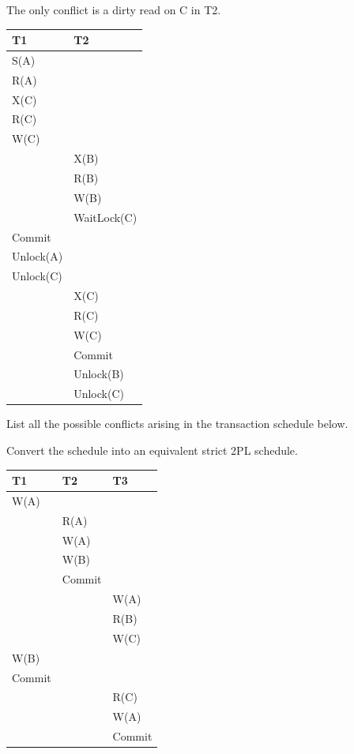 \documentclass{beamer}
\begin{document}
\begin{slide}{
	\item The only conflict is a dirty read on C in T2.
	\begin{table}
		\tiny
		\begin{tabular}{l|l}
			T1 & T2\\
			\hline
			S(A) & \\
			R(A) & \\
			X(C) & \\
			R(C) & \\
			W(C) & \\
			& X(B) \\
			& R(B) \\
			& W(B) \\
			& WaitLock(C) \\
			Commit & \\
			Unlock(A) & \\
			Unlock(C) & \\
			& X(C) \\
			& R(C) \\
		 	& W(C) \\
			& Commit \\
			& Unlock(B) \\
			& Unlock(C) \\	
		\end{tabular}
	\end{table}	
}\end{slide}

\begin{slide}{
	\item List all the possible conflicts arising in the transaction schedule below.
	\item Convert the schedule into an equivalent strict 2PL schedule.
	\begin{table}
		\tiny
		\begin{tabular}{l|l|l}
			T1 & T2 & T3\\
			\hline
			W(A) & & \\
			& R(A) & \\
			& W(A) & \\
			& W(B) & \\
			& Commit & \\
			& & W(A) \\
			& & R(B) \\
			& & W(C) \\
			W(B) & & \\
			Commit & & \\
			& & R(C) \\
			& & W(A) \\
			& & Commit\\	
		\end{tabular}
	\end{table}	
	
}\end{slide}
\end{document}
